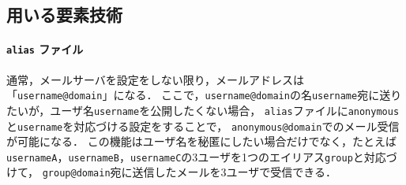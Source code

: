\newcommand{\alias}{\texttt{alias}}
\newcommand{\user}{ユーザ}
\subsection{用いる要素技術}
\paragraph{\texttt{\bfseries alias} ファイル}
通常，メールサーバを設定をしない限り，メールアドレスは「\texttt{username@domain}」になる．
ここで，\texttt{username@domain}の名\texttt{username}宛に送りたいが，\user 名\texttt{username}を公開したくない場合，
\alias ファイルに\texttt{anonymous}と\texttt{username}を対応づける設定をすることで，
\texttt{anonymous@domain}でのメール受信が可能になる．
この機能は\user 名を秘匿にしたい場合だけでなく，たとえば\texttt{usernameA}，\texttt{usernameB}，\texttt{usernameC}の3\user を1つのエイリアス\texttt{group}と対応づけて，
\texttt{group@domain}宛に送信したメールを3\user で受信できる．
